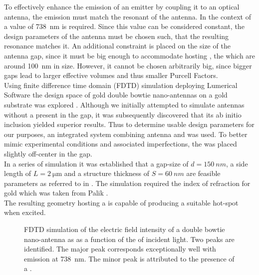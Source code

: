 		To effectively enhance the emission of an emitter by coupling it to an optical antenna, the emission \wl must match the resonant \wl of the antenna. In the context of \sivs a value of \SI{738}{nm} is required. Since this value can be considered constant, the design parameters of the antenna must be chosen such, that the resulting resonance matches it. An additional constraint is placed on the size of the antenna gap, since it must be big enough to accommodate \nds hosting \sivs, the which are around \SI{100}{\nm} in size. However, it cannot be chosen arbitrarily big, since bigger gaps lead to larger effective volumes and thus smaller Purcell Factors.
		\\
		Using finite difference time domain (FDTD) simulation deploying Lumerical Software the design space of gold double bowtie nano-antennas on a gold substrate was explored \cite{rahbany2016towards}. Although we initially attempted to simulate antennas without a \nd present in the gap, it was subsequently discovered that its ab initio inclusion yielded superior results. Thus to determine usable design parameters for our purposes, an integrated system combining antenna and \nd was used. To better mimic experimental conditions and associated imperfections, the \nd was placed slightly off-center in the gap.
		\\
		In a series of simulation it was established that a gap-size of $d = \SI{150}{nm}$, a side length of $L = \SI{2}{\micro\meter}$ and a structure thickness of $S = \SI{60}{nm}$ are feasible parameters as referred to in . The simulation required the index of refraction for gold which was taken from Palik \cite{ghosh1998handbook}.
		\\
		The resulting geometry hosting a \nd is capable of producing a suitable hot-spot when excited.

		\begin{figure}[htp]
				\centering
			\caption[Simulation of the resonance spectrum of a double bowtie antenna]{FDTD simulation of the electric field intensity of a double bowtie nano-antenna as as a function of the \wl of incident light. Two peaks are identified. The major peak corresponds exceptionally well with \siv emission at \SI{738}{nm}. The minor peak is attributed to the presence of a \nd.}
			\label{fig::antenna_fdtd_spectrum}
		\end{figure}

